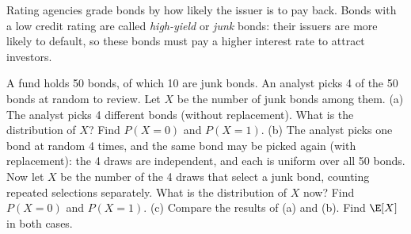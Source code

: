 
\begin{problem}
	\begin{context}
		Rating agencies grade bonds by how likely the issuer is to pay back.
		Bonds with a low credit rating are called \emph{high-yield} or
		\emph{junk} bonds: their issuers are more likely to default, so these
		bonds must pay a higher interest rate to attract investors.
	\end{context}
	A fund holds 50 bonds, of which 10 are junk bonds. An analyst picks 4 of
	the 50 bonds at random to review. Let $X$ be the number of junk bonds
	among them.
	(a) The analyst picks 4 different bonds (without replacement). What is the
	distribution of $X$? Find $P(X=0)$ and $P(X=1)$.
	(b) The analyst picks one bond at random 4 times, and the same bond may be
	picked again (with replacement): the 4 draws are independent, and each is
	uniform over all 50 bonds. Now let $X$ be the number of the 4 draws that
	select a junk bond, counting repeated selections separately. What is the
	distribution of $X$ now? Find $P(X=0)$ and $P(X=1)$.
	(c) Compare the results of (a) and (b). Find $\E[X]$ in both cases.
\end{problem}

